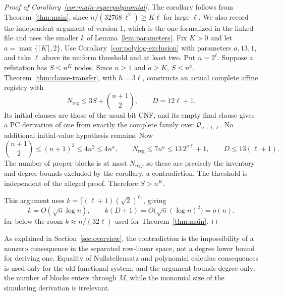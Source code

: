 \begin{proof}[Proof of Corollary~\ref{cor:main-superpolynomial}]
The corollary follows from Theorem~\ref{thm:main}, since
\(n/(32768\,\ell^2)\ge K\ell\) for large \(\ell\). We also record the
independent argument of version 1, which is the one formalized in the
linked file and uses the smaller \(k\) of Lemma~\ref{lem:parameters}.
Fix \(K>0\) and let \(a=\max\{\lceil K\rceil,2\}\).
Use Corollary~\ref{cor:polylog-exclusion} with parameters \(a,13,1\),
and take \(\ell\) above its uniform threshold and at least two.
Put \(n=2^\ell\). Suppose a refutation has \(S\le n^K\) nodes.
Since \(n\ge1\) and \(a\ge K\), \(S\le n^a\).
Theorem~\ref{thm:clause-transfer}, with \(h=3\ell\), constructs an actual
complete affine registry with
\[
 N_{\mathrm{reg}}\le3S+\binom{n+1}{2},\qquad D=12\ell+1.
\]
Its initial clauses are those of the usual bit CNF, and its empty final
clause gives a PC derivation of one from exactly the complete family over
\(\mathcal Q_{n+1,\ell}\). No additional initial-value hypothesis remains.
Now
\[
 \binom{n+1}{2}\le(n+1)^2\le4n^2\le4n^a,
 \qquad N_{\mathrm{reg}}\le7n^a\le13\,2^{a\ell}+1,
 \qquad D\le13(\ell+1).
\]
The number of proper blocks is at most \(N_{\mathrm{reg}}\), so these are precisely the
inventory and degree bounds excluded by the corollary, a contradiction.
The threshold is independent of the alleged proof. Therefore \(S>n^K\).

This argument uses \(k=\lceil(\ell+1)(\sqrt2)^\ell\rceil\), giving
\begin{equation}\label{eq:main-asymptotics}
 k=O(\sqrt n\log n),\qquad
 k(D+1)=O\bigl(\sqrt n(\log n)^2\bigr)=o(n).
\end{equation}
far below the room \(k\approx n/(32\ell)\) used for Theorem~\ref{thm:main}.
\end{proof}

\begin{remark}\label{rem:conclusion-uses}
As explained in Section~\ref{sec:overview}, the contradiction is the
impossibility of a nonzero consequence in the separated row-linear space,
not a degree lower bound for deriving one. Equality of Nullstellensatz and
polynomial calculus consequences is used only for the old functional
system, and the argument bounds degree only: the number of blocks enters
through \(M\), while the monomial size of the simulating derivation is
irrelevant.
\end{remark}

